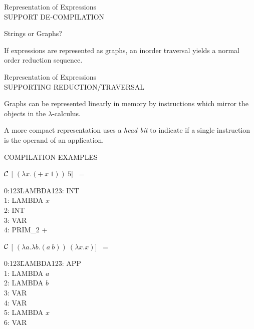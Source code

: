 \begin{slide}{}
\begin{center}
Representation of Expressions\\[.5em]
SUPPORT DE-COMPILATION\\[2em]
\end{center}
Strings or Graphs?
\vspace*{4in}
\begin{flushleft}
If expressions are represented as graphs, an inorder traversal yields 
a normal order reduction sequence.
\end{flushleft}
\end{slide}


\begin{slide}{}
\begin{center}
Representation of Expressions\\[.5em]
SUPPORTING REDUCTION/TRAVERSAL\\[2em]
\end{center}

\begin{flushleft}
Graphs can be represented linearly in memory by instructions which
mirror the objects in the $\lambda$-calculus.
\end{flushleft}
\vspace*{2in}
\begin{flushleft}
A more compact representation uses a {\em head bit} to indicate if a single
instruction is the operand of an application.
\end{flushleft}
\vspace*{2in}
\end{slide}

\begin{slide}{}
\begin{center}
	COMPILATION EXAMPLES\\[.5in]
\end{center}

$\cal C$ [ $(\lambda x . (+ \ x \ 1))\ 5$] \ =
\begin{tabbing}
0:123\=LAMBDA123\=: \> \spine INT \\
1: \> \spine LAMBDA \> $x$\\
2: \> \spine INT \\
3: \> \spine VAR \\
4: \> \head PRIM\_2 \> +
\end{tabbing}



$\cal C$ [ $(\lambda a . \lambda b . (a \ b)) \ (\lambda x . x)$] \ = 
\begin{tabbing}
0:123\=LAMBDA123\=: \> \spine APP \\
1: \> \spine LAMBDA \> $a$\\
2: \> \spine LAMBDA \> $b$\\
3: \> \spine VAR \\
4: \> \head VAR \\[1em]
5: \> \spine LAMBDA \> $x$\\
6: \> \head VAR 
\end{tabbing}
\end{slide}


